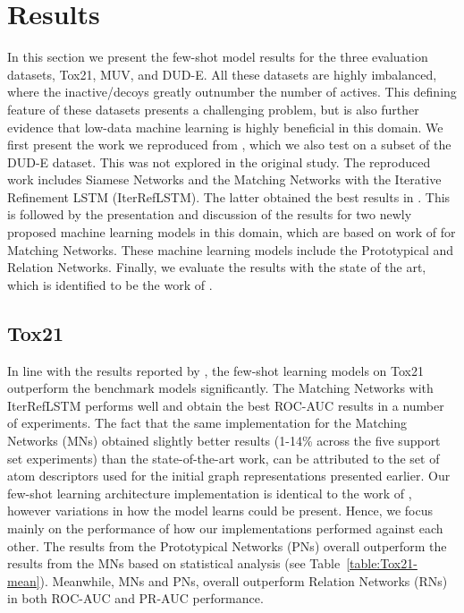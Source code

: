 \section{Results}

In this section we present the few-shot model results for the three evaluation datasets, Tox21, MUV, and DUD-E. All these datasets are highly imbalanced, where the inactive/decoys greatly outnumber the number of actives. This defining feature of these datasets presents a challenging problem, but is also further evidence that low-data machine learning is highly beneficial in this domain. We first present the work we reproduced from \citet{altae2017low}, which we also test on a subset of the DUD-E dataset. This was not explored in the original study. The reproduced work includes Siamese Networks \citep{koch2015siamese} and the Matching Networks \citep{vinyals2016matching} with the Iterative Refinement LSTM (IterRefLSTM). The latter obtained the best results in \citet{altae2017low}. This is followed by the presentation and discussion of the results for two newly proposed machine learning models in this domain, which are based on work of \citet{vinyals2016matching} for Matching Networks. These machine learning models include the Prototypical \citep{snell2017prototypical} and Relation \citep{sung2018learning} Networks. Finally, we evaluate the results with the state of the art, which is identified to be the work of \citet{altae2017low}.


\subsection{Tox21}

In line with the results reported by \citet{altae2017low}, the few-shot learning models on Tox21 outperform the benchmark models significantly. The Matching Networks with IterRefLSTM performs well and obtain the best ROC-AUC results in a number of experiments. The fact that the same implementation for the Matching Networks (MNs) obtained slightly better results (1-14\% across the five support set experiments) than the state-of-the-art work, can be attributed to the set of atom descriptors used for the initial graph representations presented earlier. Our few-shot learning architecture implementation is identical to the work of \citet{altae2017low}, however variations in how the model learns could be present. Hence, we focus mainly on the performance of how our implementations performed against each other. The results from the Prototypical Networks (PNs) overall outperform the results from the MNs based on statistical analysis (see Table~\ref{table:Tox21-mean}). Meanwhile, MNs and PNs, overall outperform Relation Networks (RNs) in both ROC-AUC and PR-AUC performance. 

